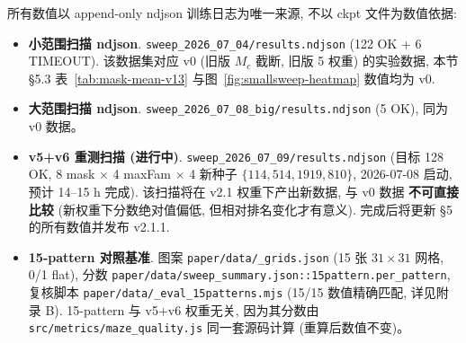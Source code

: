 所有数值以 append-only ndjson 训练日志为唯一来源, 不以 ckpt 文件为数值依据:
\begin{itemize}[leftmargin=*, itemsep=0pt, topsep=0pt]
  \item \textbf{小范围扫描 ndjson}. \texttt{sweep\_2026\_07\_04/results.ndjson} (122 OK + 6 TIMEOUT). 该数据集对应 v0 (旧版 $M_c$ 截断, 旧版 5 权重) 的实验数据, 本节 §5.3 表~\ref{tab:mask-mean-v13} 与图~\ref{fig:smallsweep-heatmap} 数值均为 v0.
  \item \textbf{大范围扫描 ndjson}. \texttt{sweep\_2026\_07\_08\_big/results.ndjson} (5 OK), 同为 v0 数据。
  \item \textbf{v5+v6 重测扫描 (进行中)}. \texttt{sweep\_2026\_07\_09/results.ndjson} (目标 128 OK, 8 mask $\times$ 4 maxFam $\times$ 4 新种子 $\{114, 514, 1919, 810\}$, 2026-07-08 启动, 预计 14--15 h 完成). 该扫描将在 v2.1 权重下产出新数据, 与 v0 数据 \textbf{不可直接比较} (新权重下分数绝对值偏低, 但相对排名变化才有意义). 完成后将更新 §5 的所有数值并发布 v2.1.1.
  \item \textbf{15-pattern 对照基准}. 图案 \texttt{paper/data/\_grids.json} (15 张 $31 \times 31$ 网格, 0/1 flat), 分数 \texttt{paper/data/sweep\_summary.json::15pattern.per\_pattern}, 复核脚本 \texttt{paper/data/\_eval\_15patterns.mjs} (15/15 数值精确匹配, 详见附录 B). 15-pattern 与 v5+v6 权重无关, 因为其分数由 \texttt{src/metrics/maze\_quality.js} 同一套源码计算 (重算后数值不变)。
\end{itemize}
